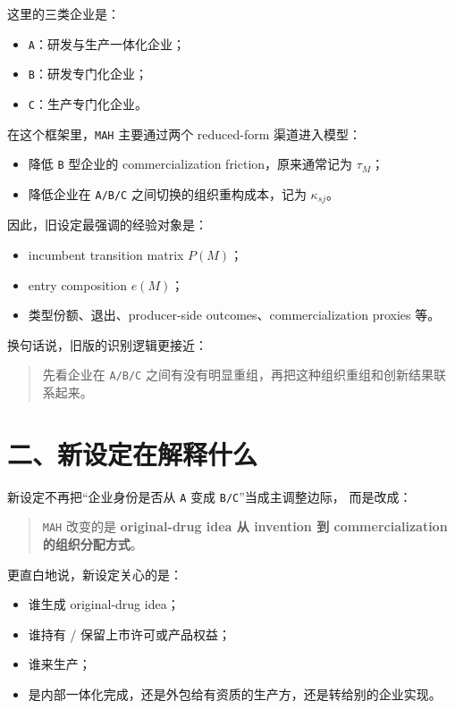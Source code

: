 \documentclass[12pt]{ctexart}
\begin{document}
这里的三类企业是：

\begin{itemize}[leftmargin=2em]
    \item \texttt{A}：研发与生产一体化企业；
    \item \texttt{B}：研发专门化企业；
    \item \texttt{C}：生产专门化企业。
\end{itemize}

在这个框架里，\texttt{MAH} 主要通过两个 reduced-form 渠道进入模型：

\begin{itemize}[leftmargin=2em]
    \item 降低 \texttt{B} 型企业的 commercialization friction，原来通常记为
    \(\tau_M\)；
    \item 降低企业在 \texttt{A/B/C} 之间切换的组织重构成本，记为
    \(\kappa_{sj}\)。
\end{itemize}

因此，旧设定最强调的经验对象是：

\begin{itemize}[leftmargin=2em]
    \item incumbent transition matrix \(P(M)\)；
    \item entry composition \(e(M)\)；
    \item 类型份额、退出、producer-side outcomes、commercialization proxies 等。
\end{itemize}

换句话说，旧版的识别逻辑更接近：

\begin{quote}
先看企业在 \texttt{A/B/C} 之间有没有明显重组，再把这种组织重组和创新结果联系起来。
\end{quote}

\section{二、新设定在解释什么}

新设定不再把“企业身份是否从 \texttt{A} 变成 \texttt{B/C}”当成主调整边际，
而是改成：

\begin{quote}
\texttt{MAH} 改变的是
\textbf{original-drug idea 从 invention 到 commercialization 的组织分配方式}。
\end{quote}

更直白地说，新设定关心的是：

\begin{itemize}[leftmargin=2em]
    \item 谁生成 original-drug idea；
    \item 谁持有 / 保留上市许可或产品权益；
    \item 谁来生产；
    \item 是内部一体化完成，还是外包给有资质的生产方，还是转给别的企业实现。
\end{itemize}
\end{document}
